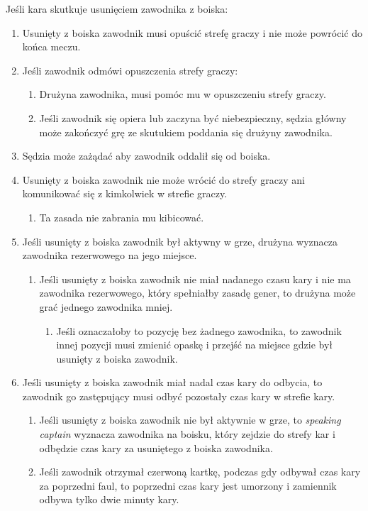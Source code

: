 \documentclass[11pt,a4paper]{article}
\renewcommand{\subsubsection}[1]{
  \oldsubsubsection{#1}%
  \label{\thesubsubsection}
}
\begin{document}
\subsubsection{Usunięcie zawodnika z boiska}
Jeśli kara skutkuje usunięciem zawodnika z boiska:
\begin{enumerate}
  \item Usunięty z boiska zawodnik musi opuścić strefę graczy i nie może powrócić do końca meczu.
  \item Jeśli zawodnik odmówi opuszczenia strefy graczy:
  \begin{enumerate}
    \item Drużyna zawodnika, musi pomóc mu w opuszczeniu strefy graczy.
    \item Jeśli zawodnik się opiera lub zaczyna być niebezpieczny, sędzia główny może zakończyć grę ze skutukiem poddania się drużyny zawodnika.
  \end{enumerate}
  \item Sędzia może zażądać aby zawodnik oddalił się od boiska.
  \item Usunięty z boiska zawodnik nie może wrócić do strefy graczy ani komunikować się z kimkolwiek w strefie graczy.
  \begin{enumerate}
    \item Ta zasada nie zabrania mu kibicować.
  \end{enumerate}
  \item Jeśli usunięty z boiska zawodnik był aktywny w grze, drużyna wyznacza zawodnika rezerwowego na jego miejsce.
  \begin{enumerate}
    \item Jeśli usunięty z boiska zawodnik nie miał nadanego czasu kary i nie ma zawodnika rezerwowego, który spełniałby zasadę gener, to drużyna może grać jednego zawodnika mniej.
    \begin{enumerate}
      \item Jeśli oznaczałoby to pozycję bez żadnego zawodnika, to zawodnik innej pozycji musi zmienić opaskę i przejść na miejsce gdzie był usunięty z boiska zawodnik.
    \end{enumerate}
  \end{enumerate}
  \item Jeśli usunięty z boiska zawodnik miał nadal czas kary do odbycia, to zawodnik go zastępujący musi odbyć pozostały czas kary w strefie kary.
  \begin{enumerate}
    \item Jeśli usunięty z boiska zawodnik nie był aktywnie w grze, to \emph{speaking captain} wyznacza zawodnika na boisku, który zejdzie do strefy kar i odbędzie czas kary za usuniętego z boiska zawodnika.
    \item Jeśli zawodnik otrzymał czerwoną kartkę, podczas gdy odbywał czas kary za poprzedni faul, to poprzedni czas kary jest umorzony i zamiennik odbywa tylko dwie minuty kary.
  \end{enumerate}
\end{enumerate}
\end{document}
